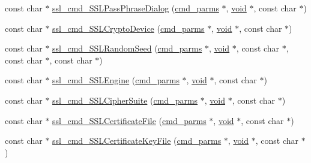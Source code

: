\begin{DoxyCompactItemize}
\item 
const char $\ast$ \hyperlink{group__MOD__SSL__PRIVATE_ga4932a2e159559a529c6f7b8acb228d01}{ssl\+\_\+cmd\+\_\+\+S\+S\+L\+Pass\+Phrase\+Dialog} (\hyperlink{group__APACHE__CORE__CONFIG_ga1791fbd28d06a9847bad001541c5241e}{cmd\+\_\+parms} $\ast$, \hyperlink{group__MOD__ISAPI_gacd6cdbf73df3d9eed42fa493d9b621a6}{void} $\ast$, const char $\ast$)
\item 
const char $\ast$ \hyperlink{group__MOD__SSL__PRIVATE_gaa1b85b3b5fcb95630b2d7a44bf4c1593}{ssl\+\_\+cmd\+\_\+\+S\+S\+L\+Crypto\+Device} (\hyperlink{group__APACHE__CORE__CONFIG_ga1791fbd28d06a9847bad001541c5241e}{cmd\+\_\+parms} $\ast$, \hyperlink{group__MOD__ISAPI_gacd6cdbf73df3d9eed42fa493d9b621a6}{void} $\ast$, const char $\ast$)
\item 
const char $\ast$ \hyperlink{group__MOD__SSL__PRIVATE_ga9a004e9d6ce2fb8f1c7d0db9dd6793ab}{ssl\+\_\+cmd\+\_\+\+S\+S\+L\+Random\+Seed} (\hyperlink{group__APACHE__CORE__CONFIG_ga1791fbd28d06a9847bad001541c5241e}{cmd\+\_\+parms} $\ast$, \hyperlink{group__MOD__ISAPI_gacd6cdbf73df3d9eed42fa493d9b621a6}{void} $\ast$, const char $\ast$, const char $\ast$, const char $\ast$)
\item 
const char $\ast$ \hyperlink{group__MOD__SSL__PRIVATE_ga130bb4d9d6834fbef197653ee20dbc86}{ssl\+\_\+cmd\+\_\+\+S\+S\+L\+Engine} (\hyperlink{group__APACHE__CORE__CONFIG_ga1791fbd28d06a9847bad001541c5241e}{cmd\+\_\+parms} $\ast$, \hyperlink{group__MOD__ISAPI_gacd6cdbf73df3d9eed42fa493d9b621a6}{void} $\ast$, const char $\ast$)
\item 
const char $\ast$ \hyperlink{group__MOD__SSL__PRIVATE_ga39db087122d646d82db4909d17b5a789}{ssl\+\_\+cmd\+\_\+\+S\+S\+L\+Cipher\+Suite} (\hyperlink{group__APACHE__CORE__CONFIG_ga1791fbd28d06a9847bad001541c5241e}{cmd\+\_\+parms} $\ast$, \hyperlink{group__MOD__ISAPI_gacd6cdbf73df3d9eed42fa493d9b621a6}{void} $\ast$, const char $\ast$)
\item 
const char $\ast$ \hyperlink{group__MOD__SSL__PRIVATE_gad626d0764f53ef190589a1b4a2c037dc}{ssl\+\_\+cmd\+\_\+\+S\+S\+L\+Certificate\+File} (\hyperlink{group__APACHE__CORE__CONFIG_ga1791fbd28d06a9847bad001541c5241e}{cmd\+\_\+parms} $\ast$, \hyperlink{group__MOD__ISAPI_gacd6cdbf73df3d9eed42fa493d9b621a6}{void} $\ast$, const char $\ast$)
\item 
const char $\ast$ \hyperlink{group__MOD__SSL__PRIVATE_gacf62182f849b1b97d34a7a845a5db0c2}{ssl\+\_\+cmd\+\_\+\+S\+S\+L\+Certificate\+Key\+File} (\hyperlink{group__APACHE__CORE__CONFIG_ga1791fbd28d06a9847bad001541c5241e}{cmd\+\_\+parms} $\ast$, \hyperlink{group__MOD__ISAPI_gacd6cdbf73df3d9eed42fa493d9b621a6}{void} $\ast$, const char $\ast$)

\end{DoxyCompactItemize}
